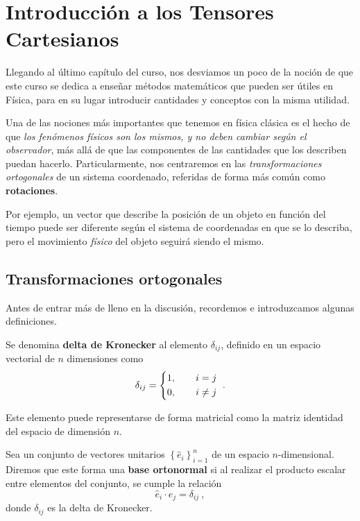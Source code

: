 \chapter{Introducción a los Tensores Cartesianos}

Llegando al último capítulo del curso, nos desviamos un poco de la noción de que este curso se dedica a enseñar métodos matemáticos que pueden ser útiles en Física, para en su lugar introducir cantidades y conceptos con la misma utilidad.

Una de las nociones más importantes que tenemos en física clásica es el hecho de que \emph{los fenómenos físicos son los mismos, y no deben cambiar según el observador}, más allá de que las componentes de las cantidades que los describen puedan hacerlo. Particularmente, nos centraremos en las \emph{transformaciones ortogonales} de un sistema coordenado, referidas de forma más común como \textbf{rotaciones}. 

Por ejemplo, un vector que describe la posición de un objeto en función del tiempo puede ser diferente según el sistema de coordenadas en que se lo describa, pero el movimiento \emph{físico} del objeto seguirá siendo el mismo.

\section{Transformaciones ortogonales}

Antes de entrar más de lleno en la discusión, recordemos e introduzcamos algunas definiciones.

\begin{defi} 
    Se denomina \textbf{delta de Kronecker} al elemento $\delta_{ij}$, definido en un espacio vectorial de $n$ dimensiones como
    \begin{equation}
        \delta_{ij} = \begin{dcases}
            1, \qquad i = j \\
            0, \qquad i \neq j
        \end{dcases} \ .
    \end{equation} 

    Este elemento puede representarse de forma matricial como la matriz identidad del espacio de dimensión $n$.
\end{defi}

\newpage

\begin{defi} 
    Sea un conjunto de vectores unitarios $\left\{ \hat{e}_i\right\}_{i=1}^n$ de un espacio $n$-dimensional. Diremos que este forma una \textbf{base ortonormal} si al realizar el producto escalar entre elementos del conjunto, se cumple la relación
    \begin{equation}
        \hat{e}_i\cdot \hat{e}_j = \delta_{ij} \ ,
    \end{equation}
    donde $\delta_{ij}$ es la delta de Kronecker.
\end{defi}

